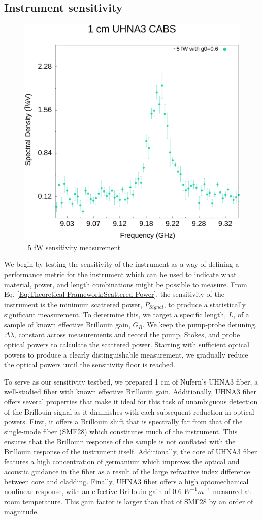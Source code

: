 \documentclass[%
  reprint,
  superscriptaddress,
  amsmath,amssymb,
  aps,
  prapplied,
]{revtex4-2}
\begin{document}
\subsection*{Instrument sensitivity}
\label{Results:Instrument sensitivity and SBS comparison}

\begin{figure}[t]
  \centering
  \includegraphics[width=.45\textwidth]{5fWSensitivity.pdf}
  \caption{~5 fW sensitivity measurement}
  \label{fig:5fWSensitivity}
\end{figure}

We begin by testing the sensitivity of the instrument as a way of defining a performance metric for the instrument which can be used to indicate what material, power, and length combinations might be possible to measure. From Eq. \ref{Eq:Theoretical Framework:Scattered Power}, the sensitivity of the instrument is the minimum scattered power, $P_{Signal}$, to produce a statistically significant measurement. To determine this, we target a specific length, $L$, of a sample of known effective Brillouin gain, $G_{B}$. We keep the pump-probe detuning, $\Delta\lambda$, constant across measurements and record the pump, Stokes, and probe optical powers to calculate the scattered power. Starting with sufficient optical powers to produce a clearly distinguishable measurement, we gradually reduce the optical powers until the sensitivity floor is reached.

To serve as our sensitivity testbed, we prepared 1 cm of Nufern's UHNA3 fiber, a well-studied fiber with known effective Brillouin gain\cite{behunin2015long}. Additionally, UHNA3 fiber offers several properties that make it ideal for this task of unambiguous detection of the Brillouin signal as it diminishes with each subsequent reduction in optical powers. First, it offers a Brillouin shift that is spectrally far from that of the single-mode fiber (SMF28) which constitutes much of the instrument. This ensures that the Brillouin response of the sample is not conflated with the Brillouin response of the instrument itself. Additionally, the core of UHNA3 fiber features a high concentration of germanium which improves the optical and acoustic guidance in the fiber as a result of the large refractive index difference between core and cladding. Finally, UHNA3 fiber offers a high optomechanical nonlinear response, with an effective Brillouin gain of 0.6 $W^{-1}m^{-1}$ measured at room temperature\cite{behunin2015long}. This gain factor is larger than that of SMF28 by an order of magnitude\cite{nikles1997brillouin}.
\end{document}
